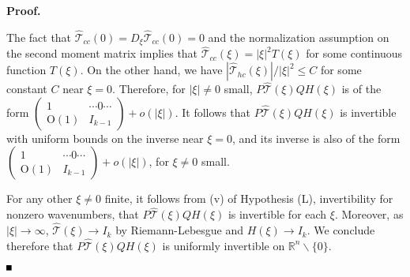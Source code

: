 \documentclass[10pt]{article}
\newenvironment{Proof}%
 {\begin{trivlist} \item[]{\bf Proof. }}%
 {\hspace*{\fill}$\rule{.4\baselineskip}{.4\baselineskip}$\end{trivlist}}
\newcommand{\R}{\mathbb{R}}
\newcommand{\rmO}{\mathrm{O}}
\newcommand{\That}{\widehat{\mathcal{T}}}
\begin{document}
\begin{Proof}
\iffalse
  |\xi|^2+o(|\xi|^2) &  \cdots \rmO(|\xi|^2)\cdots \\ \hline
  \vdots & \raisebox{-10pt}{{\large\mbox{{$I_{k-1}+\rmO(|\xi|^2)$}}}} \\[-4ex]
  \rmO(|\xi|^2) & \\[-0.5ex]
  \vdots &
\end{array}\right)\left(
\begin{array}{c|c}
  \frac{1+|\xi|^2}{|\xi|^2} & 0 \cdots 0 \\ \hline
  0 & \raisebox{-10pt}{{\large\mbox{{$I_{k-1}$}}}} \\[-4ex]
  \vdots & \\[-0.5ex]
  0 &
\end{array}\right)\\
&= \left(
\begin{array}{c|c}
  1+\frac{o(|\xi|^2)}{|\xi|^2} + |\xi|^2+o(|\xi|^2) &  \cdots \rmO(|\xi|^2)\cdots \\ \hline
  \vdots & \raisebox{-10pt}{{\large\mbox{{$I_{k-1}+\rmO(|\xi|^2)$}}}} \\[-4ex]
  \rmO(1) & \\[-0.5ex]
  \vdots &
\end{array}\right) .
\end{align*} 
\fi
The fact that $\That_{cc}(0) = D_{\xi}\That_{cc}(0) = 0$ and the normalization assumption on the second moment matrix implies that $\That_{cc}(\xi)=|\xi|^2 T(\xi)$ for some continuous function $T(\xi)$. On the other hand, we have $|\That_{hc}(\xi)|/|\xi|^2 \le C$ for some constant $C$ near $\xi = 0$. Therefore, for $|\xi|\neq 0$ small, $P\That(\xi)QH(\xi)$ is of the form
$
\begin{pmatrix}
1 & \cdots0\cdots\\ 
\rmO(1) & I_{k-1}
\end{pmatrix} + o(|\xi|)
$. It follows that $P\That(\xi)QH(\xi)$ is invertible with uniform bounds on the inverse near $\xi =0$, and its inverse is also of the form $
\begin{pmatrix}
1 & \cdots0\cdots\\ 
\rmO(1) & I_{k-1}
\end{pmatrix} + o(|\xi|)
$, for $\xi \neq 0$ small.

For any other $\xi \neq 0$ finite, it follows from (v) of Hypothesis (L), invertibility for nonzero wavenumbers, that $P\That(\xi)QH(\xi)$ is invertible for each $\xi$. Moreover, as $|\xi|\to \infty$, $\That(\xi) \to I_k$ by Riemann-Lebesgue and $H(\xi) \to I_k$. We conclude therefore that $P\That(\xi)QH(\xi)$ is uniformly invertible on $\R^n\backslash\{0\}$.


\end{Proof}
\end{document}
